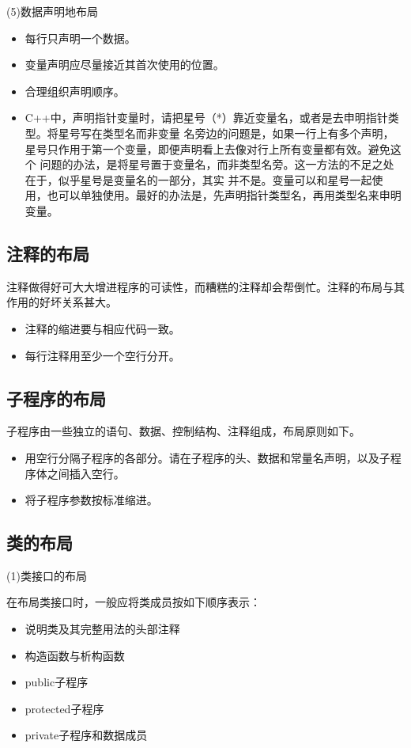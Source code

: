 \documentclass{article}
\begin{document}
\par
(5)数据声明地布局
\par
\begin{itemize}
    \item 每行只声明一个数据。
    \item 变量声明应尽量接近其首次使用的位置。
    \item 合理组织声明顺序。
    \item C++中，声明指针变量时，请把星号（*）靠近变量名，或者是去申明指针类型。将星号写在类型名而非变量
    名旁边的问题是，如果一行上有多个声明，星号只作用于第一个变量，即便声明看上去像对行上所有变量都有效。避免这个
    问题的办法，是将星号置于变量名，而非类型名旁。这一方法的不足之处在于，似乎星号是变量名的一部分，其实
    并不是。变量可以和星号一起使用，也可以单独使用。最好的办法是，先声明指针类型名，再用类型名来申明变量。
\end{itemize}

\subsection{注释的布局}
注释做得好可大大增进程序的可读性，而糟糕的注释却会帮倒忙。注释的布局与其作用的好坏关系甚大。
\begin{itemize}
    \item 注释的缩进要与相应代码一致。
    \item 每行注释用至少一个空行分开。
\end{itemize}

\subsection{子程序的布局}
子程序由一些独立的语句、数据、控制结构、注释组成，布局原则如下。
\begin{itemize}
    \item 用空行分隔子程序的各部分。请在子程序的头、数据和常量名声明，以及子程序体之间插入空行。
    \item 将子程序参数按标准缩进。
\end{itemize}

\subsection{类的布局}
\par
(1)类接口的布局
\par
在布局类接口时，一般应将类成员按如下顺序表示：
\begin{itemize}
    \item 说明类及其完整用法的头部注释
    \item 构造函数与析构函数
    \item public子程序
    \item protected子程序
    \item private子程序和数据成员
\end{itemize}
\end{document}
